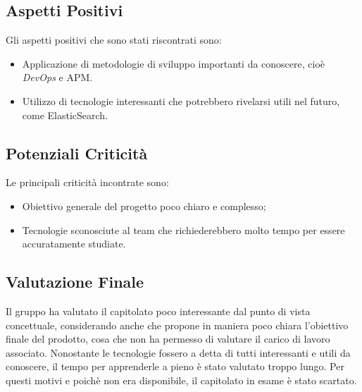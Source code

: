 \subsection{Aspetti Positivi}
	Gli aspetti positivi che sono stati riscontrati sono:
	\begin{itemize}
	\item Applicazione di metodologie di sviluppo importanti da conoscere, cioè \textit{DevOps} e APM.
	\item Utilizzo di tecnologie interessanti che potrebbero rivelarsi utili nel futuro, come ElasticSearch.
	\end{itemize}

\subsection{Potenziali Criticità}
	Le principali criticità incontrate sono:
	\begin{itemize}
		\item Obiettivo generale del progetto poco chiaro e complesso;
		\item Tecnologie sconosciute al team che richiederebbero molto tempo per essere accuratamente studiate.
	\end{itemize}

\subsection{Valutazione Finale}
	Il gruppo ha valutato il capitolato poco interessante dal punto di vista concettuale, considerando anche che propone in maniera poco chiara l'obiettivo finale del prodotto, cosa che non ha permesso di valutare il carico di lavoro associato. Nonostante le tecnologie fossero a detta di tutti interessanti e utili da conoscere, il tempo per apprenderle a pieno è stato valutato troppo lungo. Per questi motivi e poichè non era disponibile, il capitolato in esame è stato scartato.